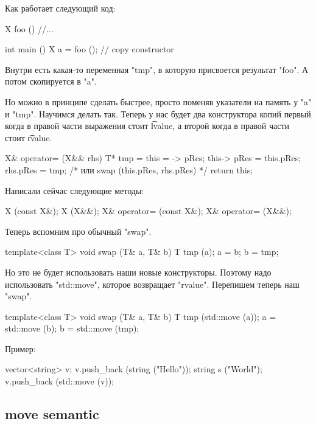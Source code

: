 Как работает следующий код:
\begin{cppcode}
X foo () {
	//...
}

int main () {
	X a = foo (); // copy constructor
}
\end{cppcode}
Внутри есть какая-то переменная \cpp"tmp", в которую присвоется результат \cpp"foo". 
А потом скопируется в \cpp"a".

Но можно в принципе сделать быстрее, просто поменяв указатели на память у \cpp"a" и \cpp"tmp". 
Научимся делать так. 
Теперь у нас будет два конструктора копий первый когда в правой части выражения стоит \t{lvalue}, а второй когда в правой части стоит \t{rvalue}.
\begin{cppcode}
X& operator= (X&& rhs) {
  T* tmp = this = -> pRes; 
  this-> pRes = this.pRes; 
  rhs.pRes = tmp;
  /* или swap (this.pRes, rhs.pRes) */
  return this; 
}
\end{cppcode}

Написали сейчас следующие методы:
\begin{cppcode}
  X (const X&); 
  X (X&&);
  X& operator= (const X&);
  X& operator= (X&&);
\end{cppcode}

Теперь вспомним про обычный \cpp"swap". 
\begin{cppcode}
template<class T>
void swap (T& a, T& b) {
  T tmp (a);
  a = b;
  b = tmp;
}
\end{cppcode}
Но это не будет использовать наши новые конструкторы. 
Поэтому надо использовать \cpp"std::move", которое возвращает \cpp"rvalue". 
Перепишем теперь наш \cpp"swap".
\begin{cppcode}
template<class T>
void swap (T& a, T& b) {
  T tmp (std::move (a));
  a = std::move (b);
  b = std::move (tmp);
}
\end{cppcode}

Пример:
\begin{cppcode}
	vector<string> v;
	v.push_back (string ("Hello"));
	string s ("World");
	v.push_back (std::move (v));
\end{cppcode}

\subsection{move semantic}
